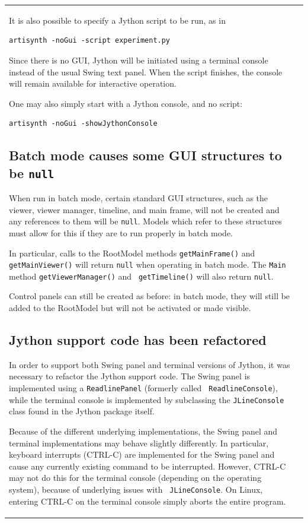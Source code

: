 \documentclass{article}
\begin{document}
\begin{tabular}{ll}
It is also possible to specify a Jython script to be run, as in
%
\begin{lstlisting}[]
   artisynth -noGui -script experiment.py
\end{lstlisting}
%
Since there is no GUI, Jython will be initiated using a terminal
console instead of the usual Swing text panel. When the script
finishes, the console will remain available for interactive operation.

One may also simply start with a Jython console, and no script:
%
\begin{lstlisting}[]
   artisynth -noGui -showJythonConsole
\end{lstlisting}
%

\subsection*{Batch mode causes some GUI structures to be {\tt null}}

When run in batch mode, certain standard GUI structures, such as the
viewer, viewer manager, timeline, and main frame, will not be created
and any references to them will be {\tt null}. Models which refer to
these structures must allow for this if they are to run properly in
batch mode.

In particular, calls to the RootModel methods {\tt getMainFrame()} and
{\tt getMainViewer()} will return {\tt null} when operating in batch
mode. The {\tt Main} method {\tt getViewerManager()} and {\tt
getTimeline()} will also return {\tt null}.

Control panels can still be created as before: in batch mode, they
will still be added to the RootModel but will not be activated or made
visible.

\subsection*{Jython support code has been refactored}

In order to support both Swing panel and terminal versions of Jython,
it was necessary to refactor the Jython support code. The Swing panel
is implemented using a {\tt ReadlinePanel} (formerly called {\tt
ReadlineConsole}), while the terminal console is implemented by
subclassing the {\tt JLineConsole} class found in the Jython package
itself.

Because of the different underlying implementations, the Swing panel
and terminal implementations may behave slightly differently.  In
particular, keyboard interrupts (CTRL-C) are implemented for the Swing
panel and cause any currently existing command to be interrupted.
However, CTRL-C may not do this for the terminal console (depending on
the operating system), because of underlying issues with {\tt
JLineConsole}. On Linux, entering CTRL-C on the terminal console
simply aborts the entire program.


\end{tabular}
\end{document}
